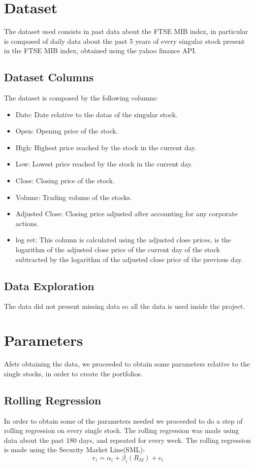 \documentclass[12pt, a4paper, twocolumn]{article} %
\begin{document}
	\section{Dataset}
	The dataset used consists in past data about the FTSE MIB index, in particular is composed of daily data about the past 5 years of every singular stock present in the FTSE MIB index, obtained using the yahoo finance API.
	\subsection{Dataset Columns}
	The dataset is composed by the following columns:
	\begin{itemize}
		\item Date: Date relative to the datas of the singular stock.
		\item Open: Opening price of the stock.
		\item High: Highest price reached by the stock in the current day.
		\item Low: Lowest price reached by the stock in the current day.
		\item Close: Closing price of the stock.
		\item Volume: Trading volume of the stocks.
		\item Adjusted Close: Closing price adjusted after accounting for any corporate actions.
		\item log ret: This column is calculated using the adjusted close prices, is the logarithm of the adjusted close price of the current day of the stock subtracted by the logarithm of the adjusted close price of the previous day.
	\end{itemize}
	
	\subsection{Data Exploration}
	The data did not present missing data so all the data is used inside the project.
	
	\section{Parameters}
	Afetr obtaining the data, we proceeded to obtain some parameters relative to the single stocks, in order to create the portfolios.
	\subsection{Rolling Regression}
	In order to obtain some of the parameters needed we proceeded to do a step of rolling regression on every single stock. The rolling regression was made using data about the past 180 days, and repeated for every week.
	The rolling regression is made using the Security Market Line(SML):
	\[
		r_i = \alpha_i +\beta_i(R_M)+e_i
	\]
	
\end{document}
